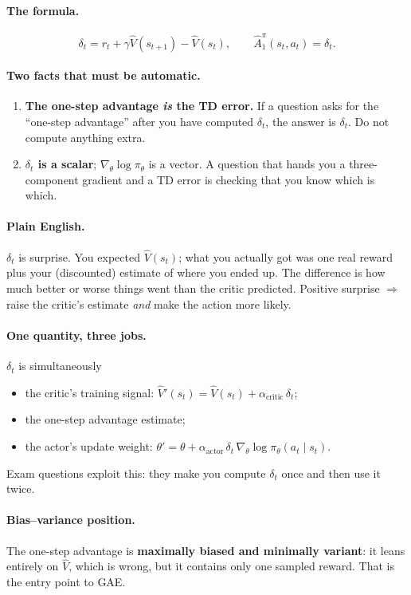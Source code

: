 \documentclass[11pt,a4paper]{article}
\begin{document}
\paragraph{The formula.}
\[
\boxed{\;\delta_t = r_t+\gamma\hat V(s_{t+1})-\hat V(s_t),\qquad
\hat A^\pi_1(s_t,a_t)=\delta_t.\;}
\]

\paragraph{Two facts that must be automatic.}
\begin{enumerate}[label=(\roman*)]
\item \textbf{The one-step advantage \emph{is} the TD error.} If a question
asks for the ``one-step advantage'' after you have computed $\delta_t$, the
answer is $\delta_t$. Do not compute anything extra.
\item \textbf{$\delta_t$ is a scalar}; $\nabla_\theta\log\pi_\theta$ is a
vector. A question that hands you a three-component gradient and a TD error
is checking that you know which is which.
\end{enumerate}

\paragraph{Plain English.} $\delta_t$ is surprise. You expected $\hat V(s_t)$;
what you actually got was one real reward plus your (discounted) estimate of
where you ended up. The difference is how much better or worse things went
than the critic predicted. Positive surprise $\Rightarrow$ raise the critic's
estimate \emph{and} make the action more likely.

\paragraph{One quantity, three jobs.} $\delta_t$ is simultaneously
\begin{itemize}
\item the critic's training signal: $\hat V'(s_t)=\hat V(s_t)+\alpha_{\text{critic}}\,\delta_t$;
\item the one-step advantage estimate;
\item the actor's update weight: $\theta'=\theta+\alpha_{\text{actor}}\,\delta_t\,\nabla_\theta\log\pi_\theta(a_t\mid s_t)$.
\end{itemize}
Exam questions exploit this: they make you compute $\delta_t$ once and then
use it twice.

\paragraph{Bias--variance position.} The one-step advantage is
\textbf{maximally biased and minimally variant}: it leans entirely on
$\hat V$, which is wrong, but it contains only one sampled reward. That is
the entry point to GAE.
\end{document}
